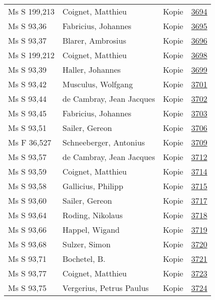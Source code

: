 \documentclass[10pt,a4paper,landscape]{report}
\begin{document}
\begin{longtable}{p{16cm}p{4cm}lr}
Ms S 199,213	&	Coignet, Matthieu	&	Kopie	&	\href{http://130.60.24.72/assignment/3694}{3694}\\
Ms S 93,36	&	Fabricius, Johannes	&	Kopie	&	\href{http://130.60.24.72/assignment/3695}{3695}\\
Ms S 93,37	&	Blarer, Ambrosius	&	Kopie	&	\href{http://130.60.24.72/assignment/3696}{3696}\\
Ms S 199,212	&	Coignet, Matthieu	&	Kopie	&	\href{http://130.60.24.72/assignment/3698}{3698}\\
Ms S 93,39	&	Haller, Johannes	&	Kopie	&	\href{http://130.60.24.72/assignment/3699}{3699}\\
Ms S 93,42	&	Musculus, Wolfgang	&	Kopie	&	\href{http://130.60.24.72/assignment/3701}{3701}\\
Ms S 93,44	&	de Cambray, Jean Jacques	&	Kopie	&	\href{http://130.60.24.72/assignment/3702}{3702}\\
Ms S 93,45	&	Fabricius, Johannes	&	Kopie	&	\href{http://130.60.24.72/assignment/3703}{3703}\\
Ms S 93,51	&	Sailer, Gereon	&	Kopie	&	\href{http://130.60.24.72/assignment/3706}{3706}\\
Ms F 36,527	&	Schneeberger, Antonius	&	Kopie	&	\href{http://130.60.24.72/assignment/3709}{3709}\\
Ms S 93,57	&	de Cambray, Jean Jacques	&	Kopie	&	\href{http://130.60.24.72/assignment/3712}{3712}\\
Ms S 93,59	&	Coignet, Matthieu	&	Kopie	&	\href{http://130.60.24.72/assignment/3714}{3714}\\
Ms S 93,58	&	Gallicius, Philipp	&	Kopie	&	\href{http://130.60.24.72/assignment/3715}{3715}\\
Ms S 93,60	&	Sailer, Gereon	&	Kopie	&	\href{http://130.60.24.72/assignment/3717}{3717}\\
Ms S 93,64	&	Roding, Nikolaus	&	Kopie	&	\href{http://130.60.24.72/assignment/3718}{3718}\\
Ms S 93,66	&	Happel, Wigand	&	Kopie	&	\href{http://130.60.24.72/assignment/3719}{3719}\\
Ms S 93,68	&	Sulzer, Simon	&	Kopie	&	\href{http://130.60.24.72/assignment/3720}{3720}\\
Ms S 93,71	&	Bochetel, B.	&	Kopie	&	\href{http://130.60.24.72/assignment/3721}{3721}\\
Ms S 93,77	&	Coignet, Matthieu	&	Kopie	&	\href{http://130.60.24.72/assignment/3723}{3723}\\
Ms S 93,75	&	Vergerius, Petrus Paulus	&	Kopie	&	\href{http://130.60.24.72/assignment/3724}{3724}\\

\end{longtable}
\end{document}
